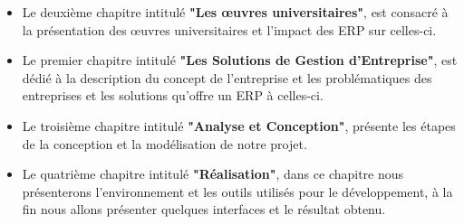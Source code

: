 \begin{itemize}
    \item Le deuxième chapitre intitulé \textbf{"Les œuvres universitaires"}, est consacré à la présentation des œuvres universitaires et l'impact des ERP sur celles-ci.
    \item Le premier chapitre intitulé \textbf{"Les Solutions de Gestion d'Entreprise"}, est dédié à la description du concept de l'entreprise et les problématiques des entreprises et les solutions qu'offre un ERP à celles-ci.
    \item Le troisième chapitre intitulé \textbf{"Analyse et Conception"}, présente les étapes de la conception et la modélisation de notre projet.
    \item Le quatrième chapitre intitulé \textbf{"Réalisation"}, dans ce chapitre nous présenterons l'environnement et les outils utilisés pour le développement, à la fin nous allons présenter quelques interfaces et le résultat obtenu.
\end{itemize}
